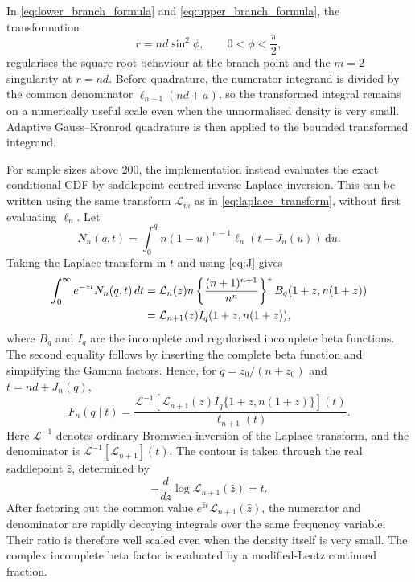 \documentclass[11pt]{article}
\theoremstyle{remark}
\newcommand{\dd}{\,\mathrm d}
\begin{document}
In \eqref{eq:lower_branch_formula} and \eqref{eq:upper_branch_formula}, the transformation
\begin{equation}
 r=nd\sin^2\phi,
 \qquad 0<\phi<\frac\pi2,
 \label{eq:sin_quad}
\end{equation}
regularises the square-root behaviour at the branch point and the $m=2$ singularity at $r=nd$. Before quadrature, the numerator integrand is divided by the common denominator $\widetilde\ell_{n+1}(nd+a)$, so the transformed integral remains on a numerically useful scale even when the unnormalised density is very small. Adaptive Gauss--Kronrod quadrature is then applied to the bounded transformed integrand.

For sample sizes above 200, the implementation instead evaluates the exact conditional CDF by saddlepoint-centred inverse Laplace inversion. This can be written using the same transform $\mathcal L_m$ as in \eqref{eq:laplace_transform}, without first evaluating $\ell_n$. Let
\[
 N_n(q,t)=\int_0^q n(1-u)^{n-1}\ell_n(t-J_n(u))\dd u.
\]
Taking the Laplace transform in $t$ and using \eqref{eq:J} gives
\begin{align}
 \int_0^\infty e^{-zt}N_n(q,t)\,dt
 &=\mathcal L_n(z)n
 \left\{\frac{(n+1)^{n+1}}{n^n}\right\}^{z}
 B_q(1+z,n(1+z)) \notag\\
 &=\mathcal L_{n+1}(z)
 I_q(1+z,n(1+z)),
 \label{eq:contour_transform}
\end{align}
where $B_q$ and $I_q$ are the incomplete and regularised incomplete beta functions. The second equality follows by inserting the complete beta function and simplifying the Gamma factors. Hence, for $q=z_0/(n+z_0)$ and $t=nd+J_n(q)$,
\begin{equation}
 F_n(q\mid t)
 =\frac{\mathcal L^{-1}[\mathcal L_{n+1}(z)
 I_q\{1+z,n(1+z)\}](t)}
 {\ell_{n+1}(t)}.
 \label{eq:contour_cdf}
\end{equation}
Here $\mathcal L^{-1}$ denotes ordinary Bromwich inversion of the Laplace transform, and the denominator is $\mathcal L^{-1}[\mathcal L_{n+1}](t)$. The contour is taken through the real saddlepoint $\widehat z$, determined by
\begin{equation}
 -\frac{d}{dz}\log\mathcal L_{n+1}(\widehat z)=t.
 \label{eq:contour_saddle}
\end{equation}
After factoring out the common value $e^{\widehat zt}\mathcal L_{n+1}(\widehat z)$, the numerator and denominator are rapidly decaying integrals over the same frequency variable. Their ratio is therefore well scaled even when the density itself is very small. The complex incomplete beta factor is evaluated by a modified-Lentz continued fraction.
\end{document}
